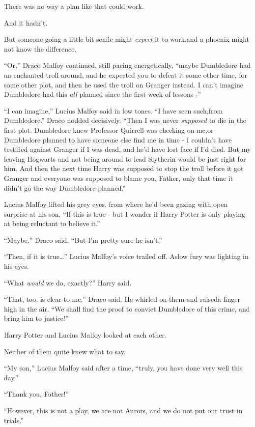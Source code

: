 There was no way a plan like that could work.

And it hadn't.

But someone going a little bit senile might \emph{expect} it to work,and a phoenix might not know the difference.

``Or,'' Draco Malfoy continued, still pacing energetically, ``maybe Dumbledore had an enchanted troll around, and he expected you to defeat it some other time, for some other plot, and then he used the troll on Granger instead. I can't imagine Dumbledore had this \emph{all} planned since the first week of lessons -''

``I can imagine,'' Lucius Malfoy said in low tones. ``I have seen such,from Dumbledore.''
Draco nodded decisively. ``Then I was never \emph{supposed} to die in the first plot. Dumbledore knew Professor Quirrell was checking on me,or Dumbledore planned to have someone else find me in time - I couldn't have testified against Granger if I was dead, and he'd have lost face if I'd died. But my leaving Hogwarts and not being around to lead Slytherin would be just right for him. And then the next time Harry was supposed to stop the troll before it got Granger and everyone was supposed to blame you, Father, only that time it didn't go the way Dumbledore planned.''

Lucius Malfoy lifted his grey eyes, from where he'd been gazing with open surprise at his son. ``If this is true - but I wonder if Harry Potter is only playing at being reluctant to believe it.''

``Maybe,'' Draco said. ``But I'm pretty sure he isn't.''

``Then, if it is true\ldots{}'' Lucius Malfoy's voice trailed off. Aslow fury was lighting in his eyes.

``What \emph{would} we do, exactly?'' Harry said.

``That, too, is clear to me,'' Draco said. He whirled on them and raiseda finger high in the air. ``We shall find the proof to convict Dumbledore of this crime, and bring him to justice!''

Harry Potter and Lucius Malfoy looked at each other.

Neither of them quite knew what to say.

``My son,'' Lucius Malfoy said after a time, ``truly, you have done very well this day.''

``Thank you, Father!''

``However, this is not a play, we are not Aurors, and we do not put our trust in trials.''

